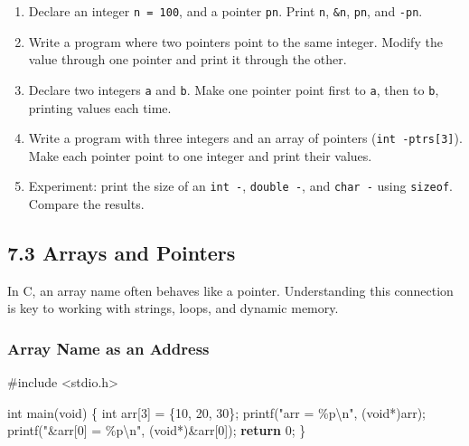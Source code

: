 \documentclass[
  letterpaper,
  DIV=11,
  numbers=noendperiod]{scrreprt}
\newenvironment{Shaded}{\begin{snugshade}}{\end{snugshade}}
\newcommand{\ControlFlowTok}[1]{\textcolor[rgb]{0.00,0.23,0.31}{\textbf{#1}}}
\newcommand{\DataTypeTok}[1]{\textcolor[rgb]{0.68,0.00,0.00}{#1}}
\newcommand{\DecValTok}[1]{\textcolor[rgb]{0.68,0.00,0.00}{#1}}
\newcommand{\ImportTok}[1]{\textcolor[rgb]{0.00,0.46,0.62}{#1}}
\newcommand{\NormalTok}[1]{\textcolor[rgb]{0.00,0.23,0.31}{#1}}
\newcommand{\OperatorTok}[1]{\textcolor[rgb]{0.37,0.37,0.37}{#1}}
\newcommand{\PreprocessorTok}[1]{\textcolor[rgb]{0.68,0.00,0.00}{#1}}
\newcommand{\SpecialCharTok}[1]{\textcolor[rgb]{0.37,0.37,0.37}{#1}}
\newcommand{\StringTok}[1]{\textcolor[rgb]{0.13,0.47,0.30}{#1}}
\providecommand{\tightlist}{%
  \setlength{\itemsep}{0pt}\setlength{\parskip}{0pt}}
\begin{document}
\begin{enumerate}
\def\labelenumi{\arabic{enumi}.}
\tightlist
\item
  Declare an integer \texttt{n\ =\ 100}, and a pointer \texttt{pn}.
  Print \texttt{n}, \texttt{\&n}, \texttt{pn}, and \texttt{-pn}.
\item
  Write a program where two pointers point to the same integer. Modify
  the value through one pointer and print it through the other.
\item
  Declare two integers \texttt{a} and \texttt{b}. Make one pointer point
  first to \texttt{a}, then to \texttt{b}, printing values each time.
\item
  Write a program with three integers and an array of pointers
  (\texttt{int\ -ptrs{[}3{]}}). Make each pointer point to one integer
  and print their values.
\item
  Experiment: print the size of an \texttt{int\ -}, \texttt{double\ -},
  and \texttt{char\ -} using \texttt{sizeof}. Compare the results.
\end{enumerate}

\subsection{7.3 Arrays and Pointers}\label{arrays-and-pointers}

In C, an array name often behaves like a pointer. Understanding this
connection is key to working with strings, loops, and dynamic memory.

\subsubsection{Array Name as an Address}\label{array-name-as-an-address}

\begin{Shaded}
\begin{Highlighting}[]
\PreprocessorTok{\#include }\ImportTok{\textless{}stdio.h\textgreater{}}

\DataTypeTok{int}\NormalTok{ main}\OperatorTok{(}\DataTypeTok{void}\OperatorTok{)} \OperatorTok{\{}
    \DataTypeTok{int}\NormalTok{ arr}\OperatorTok{[}\DecValTok{3}\OperatorTok{]} \OperatorTok{=} \OperatorTok{\{}\DecValTok{10}\OperatorTok{,} \DecValTok{20}\OperatorTok{,} \DecValTok{30}\OperatorTok{\};}
\NormalTok{    printf}\OperatorTok{(}\StringTok{"arr = }\SpecialCharTok{\%p\textbackslash{}n}\StringTok{"}\OperatorTok{,} \OperatorTok{(}\DataTypeTok{void}\OperatorTok{*)}\NormalTok{arr}\OperatorTok{);}
\NormalTok{    printf}\OperatorTok{(}\StringTok{"\&arr[0] = }\SpecialCharTok{\%p\textbackslash{}n}\StringTok{"}\OperatorTok{,} \OperatorTok{(}\DataTypeTok{void}\OperatorTok{*)\&}\NormalTok{arr}\OperatorTok{[}\DecValTok{0}\OperatorTok{]);}
    \ControlFlowTok{return} \DecValTok{0}\OperatorTok{;}
\OperatorTok{\}}
\end{Highlighting}
\end{Shaded}
\end{document}

